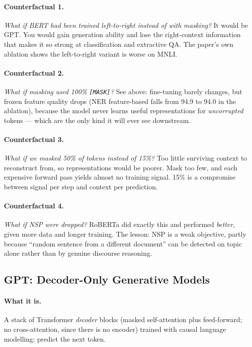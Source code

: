 \documentclass[11pt,a4paper]{article}
\begin{document}
\paragraph{Counterfactual 1.} \emph{What if BERT had been trained left-to-right instead of
with masking?} It would be GPT. You would gain generation ability and lose the right-context
information that makes it so strong at classification and extractive QA. The paper's own
ablation shows the left-to-right variant is worse on MNLI.

\paragraph{Counterfactual 2.} \emph{What if masking used 100\% \texttt{[MASK]}?} See above:
fine-tuning barely changes, but frozen feature quality drops (NER feature-based falls from
94.9 to 94.0 in the ablation), because the model never learns useful representations for
\emph{uncorrupted} tokens --- which are the only kind it will ever see downstream.

\paragraph{Counterfactual 3.} \emph{What if we masked 50\% of tokens instead of 15\%?}
Too little surviving context to reconstruct from, so representations would be poorer. Mask
too few, and each expensive forward pass yields almost no training signal. 15\% is a
compromise between signal per step and context per prediction.

\paragraph{Counterfactual 4.} \emph{What if NSP were dropped?} RoBERTa did exactly this and
performed \emph{better}, given more data and longer training. The lesson: NSP is a weak
objective, partly because ``random sentence from a different document'' can be detected on
topic alone rather than by genuine discourse reasoning.

\subsection{GPT: Decoder-Only Generative Models}

\paragraph{What it is.} A stack of Transformer \emph{decoder} blocks (masked self-attention
plus feed-forward; no cross-attention, since there is no encoder) trained with causal
language modelling: predict the next token.
\end{document}
